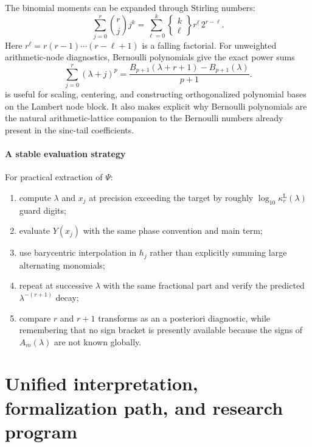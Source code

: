 \documentclass[11pt]{article}
\theoremstyle{definition}
\theoremstyle{remark}
\begin{document}
The binomial moments can be expanded through Stirling numbers:
\begin{equation}
\sum_{j=0}^{r}\binom{r}{j}j^k
=\sum_{\ell=0}^{k}
\left\{\begin{matrix}k\\\ell\end{matrix}\right\}
r^{\underline{\ell}}\,2^{r-\ell}.
\label{eq:binomial-moments}
\end{equation}
Here $r^{\underline{\ell}}=r(r-1)\cdots(r-\ell+1)$ is a falling factorial. For unweighted arithmetic-node diagnostics, Bernoulli polynomials give the exact power sums
\begin{equation}
\sum_{j=0}^{r}(\lambda+j)^p
=\frac{B_{p+1}(\lambda+r+1)-B_{p+1}(\lambda)}{p+1}.
\label{eq:bernoulli-power-sum}
\end{equation}
 is useful for scaling, centering, and constructing orthogonalized polynomial bases on the Lambert node block. It also makes explicit why Bernoulli polynomials are the natural arithmetic-lattice companion to the Bernoulli numbers already present in the sinc-tail coefficients.

\subsection{A stable evaluation strategy}

For practical extraction of $\Psi$:
\begin{enumerate}
\item compute $\lambda$ and $x_j$ at precision exceeding the target by roughly
$\log_{10}\kappa_r^{\mathrm L}(\lambda)$ guard digits;
\item evaluate $Y(x_j)$ with the same phase convention and main term;
\item use barycentric interpolation in $h_j$ rather than explicitly summing large alternating monomials;
\item repeat at successive $\lambda$ with the same fractional part and verify the predicted $\lambda^{-(r+1)}$ decay;
\item compare $r$ and $r+1$ transforms as an a posteriori diagnostic, while remembering that no sign bracket is presently available because the signs of $A_m(\lambda)$ are not known globally.
\end{enumerate}

\part{Unified interpretation, formalization path, and research program}
\end{document}
